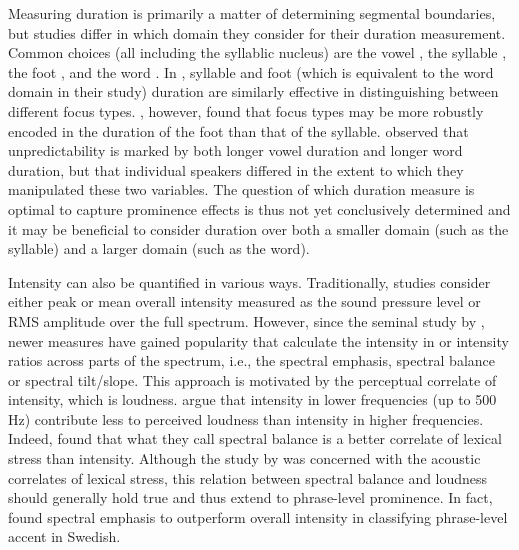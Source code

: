 Measuring duration is primarily a matter of determining segmental boundaries, but studies differ in which domain they consider for their duration measurement. Common choices (all including the syllablic nucleus) are the vowel \citep[e.g.,][]{fryDurationIntensityPhysical1955, beckmanStressNonStressAccent1986, turnbullListenerorientedPhoneticReduction2019, roessigTracingPhoneticSpace2022}, the syllable \citep[e.g.,][]{aylettSmoothSignalRedundancy2004, baumannTonalArticulatoryMarking2007, muckeEffectFocusMarking2014}, the foot \citep{baumannTonalArticulatoryMarking2007, muckeEffectFocusMarking2014}, and the word \citep[e.g.,][]{bakerVariabilityWordDuration2009, breenAcousticCorrelatesInformation2010, coleSoundStructureMeaning2019, turnbullListenerorientedPhoneticReduction2019}. In \citet{muckeEffectFocusMarking2014}, syllable and foot (which is equivalent to the word domain in their study) duration are similarly effective in distinguishing between different focus types. \citet{baumannTonalArticulatoryMarking2007}, however, found that focus types may be more robustly encoded in the duration of the foot than that of the syllable. \citet{turnbullListenerorientedPhoneticReduction2019} observed that unpredictability is marked by both longer vowel duration and longer word duration, but that individual speakers differed in the extent to which they manipulated these two variables. The question of which duration measure is optimal to capture prominence effects is thus not yet conclusively determined and it may be beneficial to consider duration over both a smaller domain (such as the syllable) and a larger domain (such as the word).

Intensity can also be quantified in various ways. Traditionally, studies consider either peak or mean overall intensity \citep[e.g.,][]{fryDurationIntensityPhysical1955} measured as the sound pressure level or RMS amplitude over the full spectrum. However, since the seminal study by \citet{sluijterSpectralBalanceAcoustic1996}, newer measures have gained popularity that calculate the intensity in or intensity ratios across parts of the spectrum, i.e., the spectral emphasis, spectral balance or spectral tilt/slope. This approach is motivated by the perceptual correlate of intensity, which is loudness. \citet{sluijterSpectralBalanceAcoustic1996} argue that intensity in lower frequencies (up to 500 Hz) contribute less to perceived loudness than intensity in higher frequencies. Indeed, \citet{sluijterSpectralBalanceAcoustic1996} found that what they call spectral balance is a better correlate of lexical stress than intensity. Although the study by \citet{sluijterSpectralBalanceAcoustic1996} was concerned with the acoustic correlates of lexical stress, this relation between spectral balance and loudness should generally hold true and thus extend to phrase-level prominence. In fact, \citet{heldnerSpectralEmphasisAdditional2001} found spectral emphasis to outperform overall intensity in classifying phrase-level accent in Swedish.


